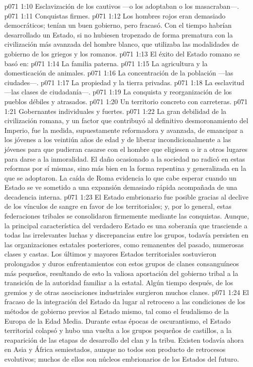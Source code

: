 \vs p071 1:10 Esclavización de los cautivos ---o los adoptaban o los masacraban---.
\vs p071 1:11 Conquistas firmes.
\vs p071 1:12 \pc Los hombres rojos eran demasiado democráticos; tenían un buen gobierno, pero fracasó. Con el tiempo habrían desarrollado un Estado, si no hubiesen tropezado de forma prematura con la civilización más avanzada del hombre blanco, que utilizaba las modalidades de gobierno de los griegos y los romanos.
\vs p071 1:13 \pc El éxito del Estado romano se basó en:
\vs p071 1:14 La familia paterna.
\vs p071 1:15 La agricultura y la domesticación de animales.
\vs p071 1:16 La concentración de la población ---las ciudades---.
\vs p071 1:17 La propiedad y la tierra privadas.
\vs p071 1:18 La esclavitud ---las clases de ciudadanía---.
\vs p071 1:19 La conquista y reorganización de los pueblos débiles y atrasados.
\vs p071 1:20 Un territorio concreto con carreteras.
\vs p071 1:21 Gobernantes individuales y fuertes.
\vs p071 1:22 \pc La gran debilidad de la civilización romana, y un factor que contribuyó al definitivo desmoronamiento del Imperio, fue la medida, supuestamente reformadora y avanzada, de emancipar a los jóvenes a los veintiún años de edad y de liberar incondicionalmente a las jóvenes para que pudieran casarse con el hombre que eligiesen o ir a otros lugares para darse a la inmoralidad. El daño ocasionado a la sociedad no radicó en estas reformas por sí mismas, sino más bien en la forma repentina y generalizada en la que se adoptaron. La caída de Roma evidencia lo que cabe esperar cuando un Estado se ve sometido a una expansión demasiado rápida acompañada de una decadencia interna.
\vs p071 1:23 \pc El Estado embrionario fue posible gracias al declive de los vínculos de sangre en favor de los territoriales; y, por lo general, estas federaciones tribales se consolidaron firmemente mediante las conquistas. Aunque, la principal característica del verdadero Estado es una soberanía que trasciende a todas las irrelevantes luchas y discrepancias entre los grupos, todavía persisten en las organizaciones estatales posteriores, como remanentes del pasado, numerosas clases y castas. Los últimos y mayores Estados territoriales sostuvieron prolongados y duros enfrentamientos con estos grupos de clanes consanguíneos más pequeños, resultando de esto la valiosa aportación del gobierno tribal a la transición de la autoridad familiar a la estatal. Algún tiempo después, de los gremios y de otras asociaciones industriales surgieron muchos clanes.
\vs p071 1:24 El fracaso de la integración del Estado da lugar al retroceso a las condiciones de los métodos de gobierno previos al Estado mismo, tal como el feudalismo de la Europa de la Edad Media. Durante estas épocas de oscurantismo, el Estado territorial colapsó y hubo una vuelta a los grupos pequeños de castillos, a la reaparición de las etapas de desarrollo del clan y la tribu. Existen todavía ahora en Asia y África semiestados, aunque no todos son producto de retrocesos evolutivos; muchos de ellos son núcleos embrionarios de los Estados del futuro.

